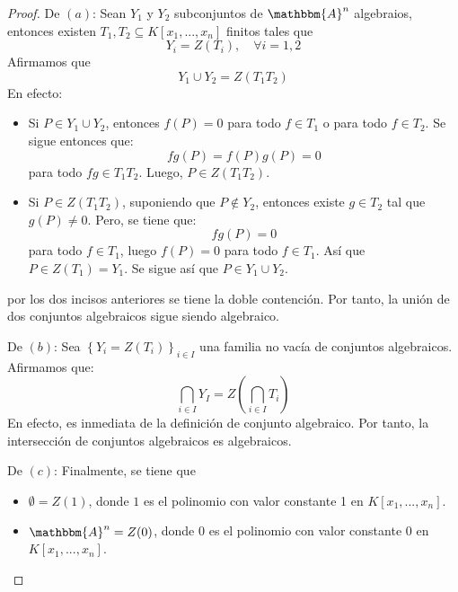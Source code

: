 \documentclass[12pt]{report}
\theoremstyle{largebreak}
\newcommand{\bbm}[1]{\ensuremath{\mathbbm{#1}}}
\begin{document}
    \begin{proof}
        De $(a)$: Sean $Y_1$ y $Y_2$ subconjuntos de $\bbm{A}^n$ algebraios, entonces existen $T_1,T_2\subseteq K[x_1,...,x_n]$ finitos tales que
        \begin{equation*}
            Y_i=Z(T_i),\quad\forall i=1,2
        \end{equation*}
        Afirmamos que
        \begin{equation*}
            Y_1\cup Y_2=Z(T_1T_2)
        \end{equation*}
        En efecto:
        \begin{itemize}
            \item Si $P\in Y_1\cup Y_2$, entonces $f(P)=0$ para todo $f\in T_1$ o para todo $f\in T_2$. Se sigue entonces que:
            \begin{equation*}
                fg(P)=f(P)g(P)=0
            \end{equation*}
            para todo $fg\in T_1T_2$. Luego, $P\in Z(T_1T_2)$.
            \item Si $P\in Z(T_1T_2)$, suponiendo que $P\notin Y_2$, entonces existe $g\in T_2$ tal que $g(P)\neq 0$. Pero, se tiene que:
            \begin{equation*}
                fg(P)=0
            \end{equation*}
            para todo $f\in T_1$, luego $f(P)=0$ para todo $f\in T_1$. Así que $P\in Z(T_1)=Y_1$. Se sigue así que $P\in Y_1\cup Y_2$.
        \end{itemize}
        por los dos incisos anteriores se tiene la doble contención. Por tanto, la unión de dos conjuntos algebraicos sigue siendo algebraico.

        De $(b)$: Sea $\left\{Y_i=Z(T_i) \right\}_{ i\in I}$ una familia no vacía de conjuntos algebraicos. Afirmamos que:
        \begin{equation*}
            \bigcap_{ i\in I}Y_I=Z\left(\bigcap_{ i\in I}T_i \right)
        \end{equation*}
        En efecto, es inmediata de la definición de conjunto algebraico. Por tanto, la intersección de conjuntos algebraicos es algebraicos.

        De $(c)$: Finalmente, se tiene que
        \begin{itemize}
            \item $\emptyset=Z(1)$, donde $1$ es el polinomio con valor constante 1 en $K[x_1,...,x_n]$.
            \item $\bbm{A}^n=Z(0)$, donde 0 es el polinomio con valor constante 0 en $K[x_1,...,x_n]$.
        \end{itemize}
    \end{proof}
    
\end{document}
